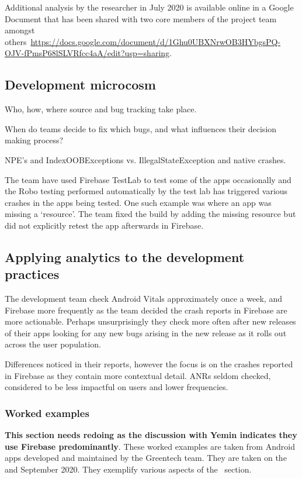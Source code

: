 Additional analysis by the researcher in July 2020 is available online in a Google Document that has been shared with two core members of the project team amongst others~\url{https://docs.google.com/document/d/1Ghu0UBXNrwOB3HYbgsPQ-OJV-fPmsP68lSLVRfcc4aA/edit?usp=sharing}.

\subsection{Development microcosm}
Who, how, where source and bug tracking take place. 

When do teams decide to fix which bugs, and what influences their decision making process?

NPE's and IndexOOBExceptions vs. IllegalStateException and native crashes.

The team have used Firebase TestLab to test some of the apps occasionally and the Robo testing performed automatically by the test lab has triggered various crashes in the apps being tested. One such example was where an app was missing a `resource'. The team fixed the build by adding the missing resource but did not explicitly retest the app afterwards in Firebase. 

\subsection{Applying analytics to the development practices}

The development team check Android Vitals approximately once a week, and Firebase more frequently as the team decided the crash reports in Firebase are more actionable. Perhaps unsurprisingly they check more often after new releases of their apps looking for any new bugs arising in the new release as it rolls out across the user population.



Differences noticed in their reports, however the focus is on the crashes reported in Firebase as they contain more contextual detail. ANRs seldom checked, considered to be less impactful on users and lower frequencies.

\subsubsection{Worked examples}
\textbf{This section needs redoing as the discussion with Yemin indicates they use Firebase predominantly}.
These worked examples are taken from Android apps developed and maintained by the Greentech team. They are taken on the  and  September 2020. They exemplify various aspects of the~\href{section-select-aggregate-scope-analyse-triage-and-prioritise}{\MakeLowercase{\emph{}}} section. %



